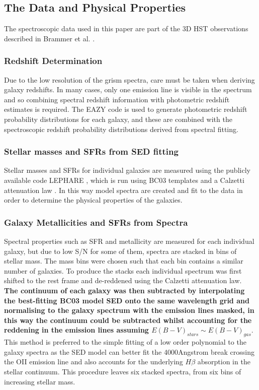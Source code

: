 \documentclass{literature}
\begin{document}
\subsection{The Data and Physical Properties}
The spectroscopic data used in this paper are part of the 3D HST observations described in Brammer et al. \citep{Brammer2012}. 

\subsubsection{Redshift Determination}
Due to the low resolution of the grism spectra, care must be taken when deriving galaxy redshifts. In many cases, only one emission line is visible in the spectrum and so combining spectral redshift information with photometric redshift estimates is required. The EAZY code \citep{Brammer2008} is used to generate photometric redshift probability distributions for each galaxy, and these are combined with the spectroscopic redshift probability distributions derived from spectral fitting. 

\subsubsection{Stellar masses and SFRs from SED fitting}
Stellar masses and SFRs for individual galaxies are measured using the publicly available code LEPHARE \citep{Ilbert2006}, which is run using BC03 templates \citep{Bruzual2003} and a Calzetti attenuation law \citep{Calzetti2000}. In this way model spectra are created and fit to the data in order to determine the physical properties of the galaxies. 

\subsubsection{Galaxy Metallicities and SFRs from Spectra}
Spectral properties such as SFR and metallicity are measured for each individual galaxy, but due to low S/N for some of them, spectra are stacked in bins of stellar mass. The mass bins were chosen such that each bin contains a similar number of galaxies. To produce the stacks each individual spectrum was first shifted to the rest frame and de-reddened using the Calzetti attenuation law. \textbf{The continuum of each galaxy was then subtracted by interpolating the best-fitting BC03 model SED onto the same wavelength grid and normalising to the galaxy spectrum with the emission lines masked, in this way the continuum could be subtracted whilst accounting for the reddening in the emission lines assuming $E(B-V)_{stars} \sim E(B-V)_{gas}$}. This method is preferred to the simple fitting of a low order polynomial to the galaxy spectra as the SED model can better fit the 4000Angstrom break crossing the OII emission line and also accounts for the underlying $H\beta$ absorption in the stellar continuum. This procedure leaves six stacked spectra, from six bins of increasing stellar mass. 
\end{document}

